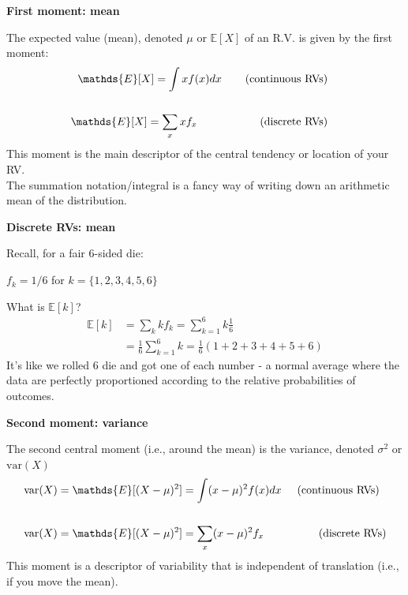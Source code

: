 \documentclass[12pt,xcolor=svgnames]{beamer}
\newcommand{\bl}{\color{blue}}
\newcommand{\theme}{\color{FireBrick}}
\newcommand{\ds}[1]{\mathds{#1}}
\newcommand{\sk}{\vspace{.4cm}}
\newcommand{\chap}[1]{{\theme \Large \bf #1} \sk}
\newcommand{\E}{\ds{E}}
\newcommand{\var}{\text{var}}
\begin{document}
\begin{frame}
\chap{First moment: {\bf mean} }

The expected value (mean), denoted $\mu$ or $\E[X]$  of an R.V. is given by the first moment:
\begin{align*}
\E[X] = \int x f(x) dx \text{\hspace{0.75cm}(continuous RVs)}\\
& \\
\E[X] = \sum_x x f_x \text{\hspace{2cm}(discrete RVs)}
\end{align*}
This moment is the main descriptor of the central tendency or location of your RV. \\
\sk
{\tiny The summation notation/integral is a fancy way of writing down an arithmetic mean of the distribution.}

\end{frame}


\begin{frame}
\chap{Discrete RVs: mean}

Recall, for a fair 6-sided die:

$f_k = 1/6$ for $k= \{1,2,3,4,5,6\}$

\sk
What is $\E[k]$?
\begin{align*}
\E[k] & = \sum_k k f_k  = \sum_{k=1}^{6} k \frac{1}{6}\\
& = \frac{1}{6}  \sum_{k=1}^{6} k = \frac{1}{6} (1+2+3+4+5+6)
\end{align*}
It's like we rolled 6 die and got one of each number - a normal average where the data are perfectly proportioned according to the relative probabilities of outcomes.

\end{frame}



\begin{frame}
\chap{Second moment: variance}

The second {\bl central} moment (i.e., around the mean) is the variance, denoted $\sigma^2$ or $\var(X)$
\begin{align*}
\var(X) & = \E[(X-\mu)^2] = \int (x-\mu)^2 f(x) dx \text{\hspace{0.5cm}(continuous RVs)}\\
&\\
\var(X) & = \E[(X-\mu)^2] = \sum_x (x-\mu)^2 f_x \text{\hspace{1.75cm}(discrete RVs)}
\end{align*}
This moment is a descriptor of variability that is independent of translation (i.e., if you move the mean). 

\end{frame}
\end{document}
